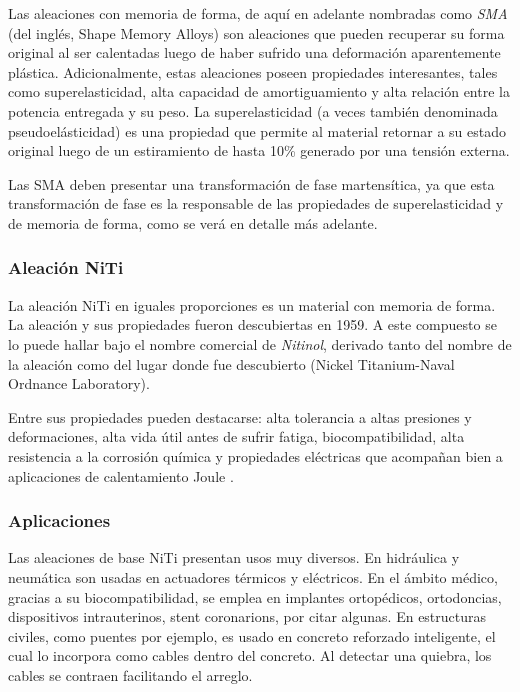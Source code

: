 \documentclass[12pt]{article}
\theoremstyle{definition}
\theoremstyle{remark}
\begin{document}
Las aleaciones con memoria de forma, de aquí en adelante nombradas como \textit{SMA} (del inglés, Shape Memory Alloys) son aleaciones que pueden recuperar su forma original al ser calentadas luego de haber sufrido una deformación aparentemente plástica. Adicionalmente, estas aleaciones poseen propiedades interesantes, tales como superelasticidad, alta capacidad de amortiguamiento y alta relación entre la potencia entregada y su peso. La superelasticidad (a veces también denominada pseudoelásticidad) es una propiedad que permite al material retornar a su estado original luego de un estiramiento de hasta 10\% generado por una tensión externa\cite{Rubber}.

Las SMA deben presentar una transformación de fase martensítica, ya que esta transformación de fase es la responsable de las propiedades de superelasticidad y de memoria de forma, como se verá en detalle más adelante.

\subsubsection{Aleación NiTi}\label{aleation}
La aleación NiTi en iguales proporciones es un material con memoria de forma. La aleación y sus propiedades fueron descubiertas en 1959. A este compuesto se lo puede hallar bajo el nombre comercial de \textit{Nitinol}, derivado tanto del nombre de la aleación como del lugar donde fue descubierto (Nickel Titanium-Naval Ordnance Laboratory)\cite{Story}. 

Entre sus propiedades pueden destacarse: alta tolerancia a altas presiones y deformaciones, alta vida útil antes de sufrir fatiga, biocompatibilidad, alta resistencia a la corrosión química y propiedades eléctricas que acompañan bien a aplicaciones de calentamiento Joule \cite{ThinFilm}.

\subsubsection{Aplicaciones}
Las aleaciones de base NiTi presentan usos muy diversos. En hidráulica y neumática son usadas en actuadores térmicos y eléctricos. En el ámbito médico, gracias a su biocompatibilidad, se emplea en implantes ortopédicos, ortodoncias, dispositivos intrauterinos, stent coronarions, por citar algunas. En estructuras civiles, como puentes por ejemplo, es usado en concreto reforzado inteligente, el cual lo incorpora como cables dentro del concreto. Al detectar una quiebra, los cables se contraen facilitando el arreglo\cite{Engineering}.
\end{document}
